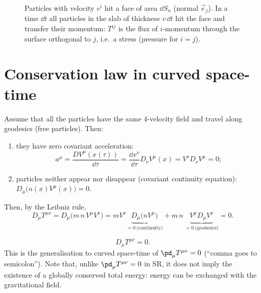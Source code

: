 \begin{figure}[ht]
\centering
{}
\caption{Particles with velocity $v^i$ hit a face of area $\dd S_n$ (normal $\vec e_j$). In a time $\dd t$ all particles in the slab of thickness $v\,\dd t$ hit the face and transfer their momentum: $T^{ij}$ is the flux of $i$-momentum through the surface orthogonal to $j$, i.e.\ a stress (pressure for $i=j$).}
\label{fig:box}
\end{figure}

\section{Conservation law in curved space-time}

Assume that all the particles have the same 4-velocity field and travel along geodesics (free particles). Then:
\begin{enumerate}
\item they have zero covariant acceleration:
\begin{equation}
  a^\mu=\frac{DV^\mu(x(\tau))}{\dd\tau}=\frac{\dd x^\nu}{\dd\tau}D_\nu V^\mu(x)=V^\nu D_\nu V^\mu=0 ;
\end{equation}
\item particles neither appear nor disappear (covariant continuity equation): $D_\mu\big(n(x)V^\mu(x)\big)=0$.
\end{enumerate}
Then, by the Leibniz rule,
\begin{equation}
  D_\mu T^{\mu\nu}=D_\mu\big(m\,n\,V^\mu V^\nu\big)=m V^\nu\underbrace{D_\mu\big(nV^\mu\big)}_{=0\ \text{(continuity)}}+m\,n\,\underbrace{V^\mu D_\mu V^\nu}_{=0\ \text{(geodesics)}}=0 .
\end{equation}

\begin{keyresult}
\begin{equation}
  D_\mu T^{\mu\nu}=0 .
\end{equation}
This is the generalisation to curved space-time of $\pd_\mu T^{\mu\nu}=0$ (``comma goes to semicolon''). Note that, unlike $\pd_\mu T^{\mu\nu}=0$ in SR, it does not imply the existence of a globally conserved total energy: energy can be exchanged with the gravitational field.
\end{keyresult}

